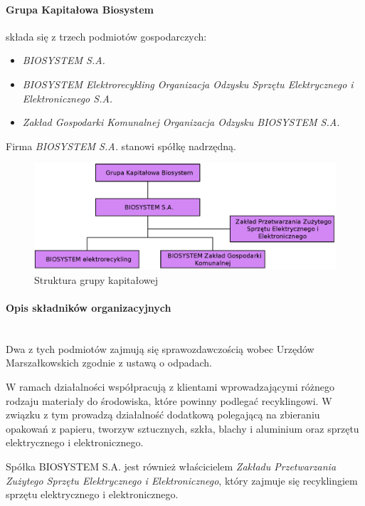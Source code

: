 

\paragraph{Grupa Kapitałowa Biosystem} składa się z trzech podmiotów gospodarczych:
\begin{itemize}
	\item \emph{BIOSYSTEM S.A.}
	\item \emph{BIOSYSTEM Elektrorecykling Organizacja Odzysku Sprzętu Elektrycznego i Elektronicznego S.A.}
	\item \emph{Zakład Gospodarki Komunalnej Organizacja Odzysku BIOSYSTEM S.A.}
\end{itemize}
Firma \emph{BIOSYSTEM S.A.} stanowi spółkę nadrzędną.

\begin{figure}[H]
	\centering
	\includegraphics[width=\textwidth]{img/group_chart.eps}
	\caption{Struktura grupy kapitałowej}
\end{figure}

\paragraph{Opis składników organizacyjnych} \ \\
Dwa z tych podmiotów zajmują się sprawozdawczością wobec Urzędów Marszałkowskich zgodnie z ustawą o odpadach.

W ramach działalności współpracują z klientami wprowadzającymi różnego rodzaju materiały do środowiska, które powinny podlegać recyklingowi. W związku z tym prowadzą działalność dodatkową polegającą na zbieraniu opakowań z papieru, tworzyw sztucznych, szkła, blachy i aluminium oraz sprzętu elektrycznego i elektronicznego.

Spółka BIOSYSTEM S.A. jest również właścicielem \emph{Zakładu Przetwarzania Zużytego Sprzętu Elektrycznego i Elektronicznego}, który zajmuje się recyklingiem sprzętu elektrycznego i elektronicznego. 

